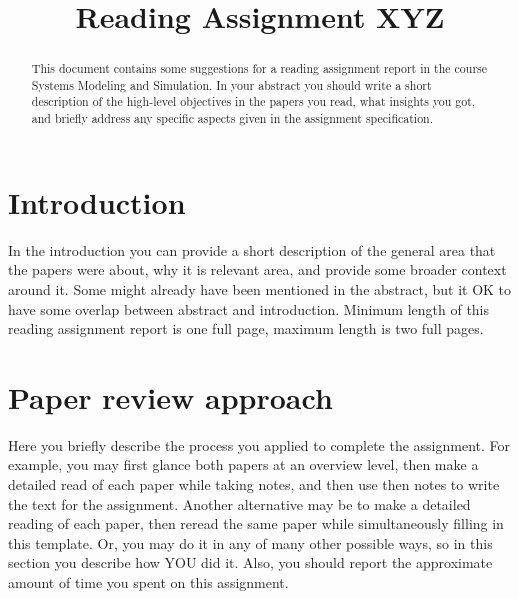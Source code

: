 \documentclass[conference]{IEEEtran}
\begin{document}
\title{Reading Assignment XYZ
}

\author{

}

\maketitle

\begin{abstract}
This document contains some suggestions for a reading assignment report in the course Systems Modeling and Simulation. In your abstract you should write a short description of the high-level objectives in the papers you read, what insights you got, and briefly address any specific aspects given in the assignment specification.

\end{abstract}


\section{Introduction}
In the introduction you can provide a short description of the general area that the papers were about, why it is relevant area, and provide some broader context around it. Some might already have been mentioned in the abstract, but it OK to have some overlap between abstract and introduction. Minimum length of this reading assignment report is one full page, maximum length is two full pages.


\section{Paper review approach}
Here you briefly describe the process you applied to complete the assignment. For example, you may first glance both papers at an overview level, then make a detailed read of each paper while taking notes, and then use then notes to write the text for the assignment. Another alternative may be to make a detailed reading of each paper, then reread the same paper while simultaneously filling in this template. Or, you may do it in any of many other possible ways, so in this section  you describe how YOU did it. Also, you should report the approximate amount of time you spent on this assignment.
\end{document}
